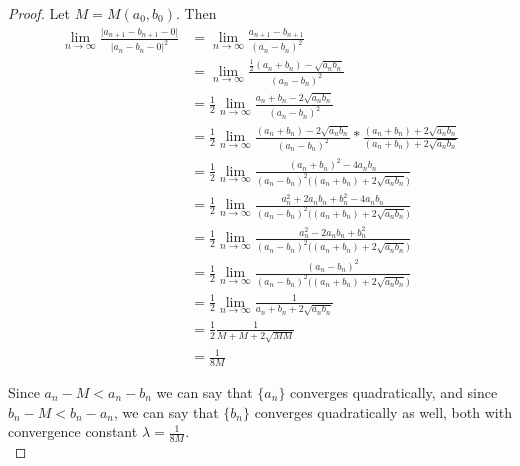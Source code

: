 \documentclass[12pt]{article}
\begin{document}
\begin{proof}
		Let $M = M(a_{0}, b_{0})$. Then \\
		\begin{align*}
			\lim\limits_{n \to \infty} \frac{\vert a_{n+1} - b_{n+1} - 0\vert}{ \vert a_n - b_n - 0 \vert ^ 2} & = \lim\limits_{n \to \infty} \frac{a_{n+1}-b_{n+1}}{(a_n -b_n) ^ 2} \\
			& = \lim\limits_{n \to \infty} \frac{ \frac{1}{2}(a_n+b_n) - \sqrt{a_nb_n}}{(a_n -b_n) ^ 2} \\
			& = \frac{1}{2} \lim\limits_{n \to \infty} \frac{a_n + b_n - 2\sqrt{a_nb_n}}{(a_n -b_n) ^ 2} \\
			& = \frac{1}{2} \lim\limits_{n \to \infty} \frac{(a_n + b_n) - 2\sqrt{a_nb_n}}{(a_n -b_n) ^ 2} * \frac{(a_n + b_n) + 2\sqrt{a_nb_n}}{(a_n + b_n) + 2\sqrt{a_nb_n}}\\
			& = \frac{1}{2} \lim\limits_{n \to \infty} \frac{(a_n + b_n)^2 - 4a_nb_n}{(a_n -b_n) ^ 2 \big( (a_n + b_n) + 2\sqrt{a_nb_n} \big) } \\
			& = \frac{1}{2} \lim\limits_{n \to \infty} \frac{a_n^2 + 2a_nb_n + b_n^2 - 4a_nb_n}{(a_n -b_n) ^ 2 \big( (a_n + b_n) + 2\sqrt{a_nb_n} \big) } \\
			& = \frac{1}{2} \lim\limits_{n \to \infty} \frac{a_n^2 - 2a_nb_n + b_n^2}{(a_n -b_n) ^ 2 \big( (a_n + b_n) + 2\sqrt{a_nb_n} \big) } \\
			& = \frac{1}{2} \lim\limits_{n \to \infty} \frac{(a_n -b_n) ^ 2}{(a_n -b_n) ^ 2 \big( (a_n + b_n) + 2\sqrt{a_nb_n} \big) } \\
			& = \frac{1}{2} \lim\limits_{n \to \infty} \frac{1}{ a_n + b_n + 2\sqrt{a_nb_n} } \\
			& = \frac{1}{2} \frac{1}{ M + M + 2\sqrt{MM} } \\
			& = \frac{1}{8M}
		\end{align*}
		
		Since $ a_n - M < a_n - b_n$ we can say that $\{a_n\}$ converges quadratically, and since $b_n - M < b_n - a_n$, we can say that $\{b_n\}$ converges quadratically as well, both with convergence constant $\lambda = \frac{1}{8M}$. \\
		
		
		
		
		 
	\end{proof}
\end{document}
